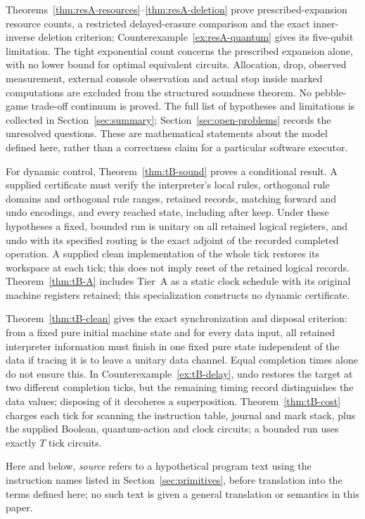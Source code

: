 Theorems~\ref{thm:resA-resources}--\ref{thm:resA-deletion} prove prescribed-expansion resource counts, a restricted delayed-erasure comparison and the exact inner-inverse deletion criterion; Counterexample~\ref{ex:resA-quantum} gives its five-qubit limitation. The tight exponential count concerns the prescribed expansion alone, with no lower bound for optimal equivalent circuits. Allocation, drop, observed measurement, external console observation and actual stop inside marked computations are excluded from the structured soundness theorem. No pebble-game trade-off continuum is proved. The full list of hypotheses and limitations is collected in Section~\ref{sec:summary}; Section~\ref{sec:open-problems} records the unresolved questions. These are mathematical statements about the model defined here, rather than a correctness claim for a particular software executor.

For dynamic control, Theorem~\ref{thm:tB-sound} proves a conditional result. A supplied certificate must verify the interpreter's local rules, orthogonal rule domains and orthogonal rule ranges, retained records, matching forward and undo encodings, and every reached state, including after keep. Under these hypotheses a fixed, bounded run is unitary on all retained logical registers, and undo with its specified routing is the exact adjoint of the recorded completed operation. A supplied clean implementation of the whole tick restores its workspace at each tick; this does not imply reset of the retained logical records. Theorem~\ref{thm:tB-A} includes Tier~A as a static clock schedule with its original machine registers retained; this specialization constructs no dynamic certificate.

Theorem~\ref{thm:tB-clean} gives the exact synchronization and disposal criterion: from a fixed pure initial machine state and for every data input, all retained interpreter information must finish in one fixed pure state independent of the data if tracing it is to leave a unitary data channel. Equal completion times alone do not ensure this. In Counterexample~\ref{ex:tB-delay}, undo restores the target at two different completion ticks, but the remaining timing record distinguishes the data values; disposing of it decoheres a superposition. Theorem~\ref{thm:tB-cost} charges each tick for scanning the instruction table, journal and mark stack, plus the supplied Boolean, quantum-action and clock circuits; a bounded run uses exactly $T$ tick circuits.

Here and below, \emph{source} refers to a hypothetical program text using
the instruction names listed in Section~\ref{sec:primitives}, before translation
into the terms defined here; no such text is given a general translation or
semantics in this paper.

